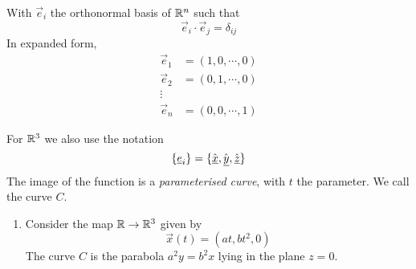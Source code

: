 \documentclass{article}
\numberwithin{equation}{section}
\begin{document}
With $\vec e_i$ the orthonormal basis of $\mathbb{R}^n$ such that
\[\vec e_i \cdot \vec e_j = \delta_{ij}\]
In expanded form,
\begin{align*}
    \vec e_1 &= (1, 0, \cdots, 0) \\
    \vec e_2 &= (0, 1, \cdots, 0) \\
    \vdots & \\
    \vec e_n &= (0, 0, \cdots, 1)
\end{align*}

For $\mathbb{R}^3$ we also use the notation
\[\{\underline{e}_i\} = \{\hat{\underline{x}}, \hat{\underline{y}}, \hat{\underline{z}}\}\]
The image of the function is a \emph{parameterised curve}, with $t$ the parameter. We call the curve $C$.

\begin{eg}\leavevmode
\begin{enumerate}
    \item Consider the map $\mathbb{R} \rightarrow \mathbb{R}^3$ given by 
    \[\vec x(t) = (at, bt^2, 0)\]
    The curve $C$ is the parabola $a^2y = b^2x$ lying in the plane $z = 0$.
    \begin{center}
    \end{center}


\end{enumerate}
\end{eg}
\end{document}
